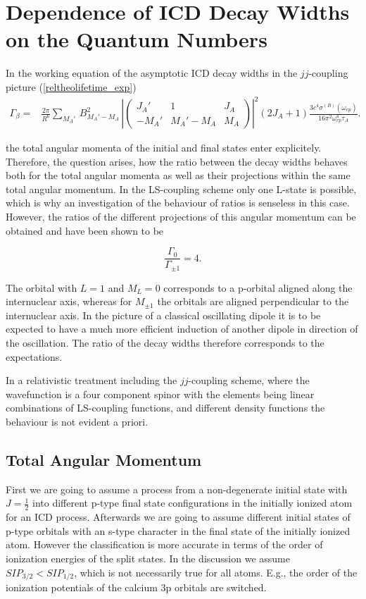 \chapter{Dependence of \ac{ICD} Decay Widths on the Quantum Numbers}
\label{chapter:res_symmetry}

In the working equation of the asymptotic \ac{ICD} decay widths in the
$jj$-coupling
picture (\ref{reltheolifetime_exp})
\begin{align}
 \Gamma_\beta =& \frac{2\pi}{R^6} \sum\limits_{M_A'} \, B_{M_A'-M_A}^2 \, \left| \left(
\begin{array}{ccc}
J_A'  & 1        & J_A\\
-M_A' & M_A'-M_A & M_A
\end{array}\right) \right|^2
 (2J_A+1)\frac{3c^4 \sigma^{(B)}(\omega_{vp})}{16\pi^2\omega_{vp}^4\tau_A} .
\end{align}

the total angular momenta of the initial and final states enter explicitely.
Therefore, the question arises, how the ratio between the decay widths behaves
both for the total angular momenta as well as their projections within the
same total angular momentum. In the LS-coupling scheme only one L-state is possible,
which is why an investigation of the behaviour of ratios is senseless in this
case. However, the ratios of the different projections of this angular momentum
can be obtained and have been shown to be \cite{Gokhberg10_1}

\begin{equation}
  \frac{\Gamma_0}{\Gamma_{\pm 1}} = 4  .
\end{equation}

The orbital with $L=1$ and $M_L=0$ corresponds to a p-orbital aligned along
the internuclear axis, whereas for $M_{\pm 1}$ the orbitals are aligned perpendicular
to the internuclear axis. In the picture of a classical oscillating dipole it is
to be expected to have a much more efficient induction of another dipole
in direction of the oscillation. The ratio of the decay widths therefore
corresponds to the expectations.

In a relativistic treatment including the $jj$-coupling scheme,
where the wavefunction
is a four component spinor with the elements being linear combinations
of LS-coupling functions, and different density functions the behaviour is
not evident a priori.

\section{Total Angular Momentum}
First we are going to assume a process
from a non-degenerate initial state with $J=\frac 12$ into different
p-type final state configurations
in the initially ionized atom for an \ac{ICD} process. Afterwards we are going
to assume different initial states of p-type orbitals with an s-type
character in the final state of the initially ionized atom.
However the classification is more accurate in terms of the order of
ionization energies of the split states. In the discussion we assume
$SIP_{3/2}<SIP_{1/2}$, which is not necessarily true for all atoms. E.g.,
the order of the ionization potentials of the calcium 3p orbitals are
switched.

